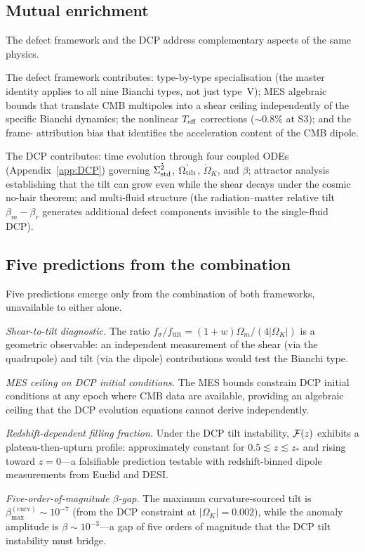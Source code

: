 \subsection{Mutual enrichment}

The defect framework and the DCP address complementary aspects
of the same physics.

The defect framework contributes:
type-by-type specialisation (the master identity applies to all
nine Bianchi types, not just type~V); MES algebraic bounds
that translate CMB multipoles into a shear ceiling
independently of the specific Bianchi dynamics; the nonlinear
$T_{\mathrm{eff}}$ corrections ($\sim 0.8\%$ at S3); and the frame-
attribution bias that identifies the acceleration content of
the CMB dipole.

The DCP contributes:
time evolution through four coupled ODEs
(Appendix~\ref{app:DCP}) governing $\dot{\Sigma^2_{\mathrm{std}}}$,
$\dot{\Omega_{\mathrm{tilt}}}$, $\dot{\Omega}_K$, and $\dot{\beta}$;
attractor analysis establishing that the tilt can grow even
while the shear decays under the cosmic no-hair theorem; and
multi-fluid structure (the radiation--matter relative tilt
$\beta_m - \beta_r$ generates additional defect components
invisible to the single-fluid DCP).


\subsection{Five predictions from the combination}

Five predictions emerge only from the combination of both
frameworks, unavailable to either alone.

\emph{Shear-to-tilt diagnostic.}
The ratio
$f_\sigma/f_{\mathrm{tilt}} = (1+w)\Omega_m/(4|\Omega_K|)$
is a geometric observable: an independent measurement of the
shear (via the quadrupole) and tilt (via the dipole)
contributions would test the Bianchi type.

\emph{MES ceiling on DCP initial conditions.}
The MES bounds constrain DCP initial conditions at any epoch
where CMB data are available, providing an algebraic ceiling
that the DCP evolution equations cannot derive independently.

\emph{Redshift-dependent filling fraction.}
Under the DCP tilt instability, $\mathcal{F}(z)$ exhibits a
plateau-then-upturn profile: approximately constant for
$0.5 \lesssim z \lesssim z_*$ and rising toward $z = 0$---a
falsifiable prediction testable with redshift-binned dipole
measurements from Euclid and DESI.

\emph{Five-order-of-magnitude $\beta$-gap.}
The maximum curvature-sourced tilt is
$\beta_{\max}^{(\mathrm{curv})} \sim 10^{-7}$ (from the DCP
constraint at $|\Omega_K| = 0.002$), while the anomaly
amplitude is $\beta \sim 10^{-3}$---a gap of five orders of
magnitude that the DCP tilt instability must bridge.


